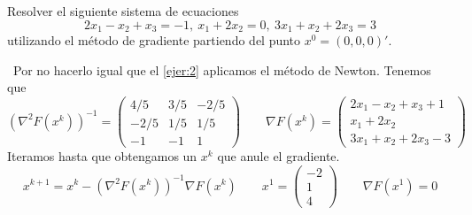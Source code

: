 \documentclass[twoside]{article}
\begin{document}
\newpage 

\begin{ejercicio}{9}
Resolver el siguiente sistema de ecuaciones
\[
2x_1-x_2+x_3=-1,\ x_1+2x_2=0,\ 3x_1+x_2+2x_3=3
\]
utilizando el método de gradiente partiendo del punto $x^0=(0,0,0)'$.
\begin{solucion}\
Por no hacerlo igual que el \ref{ejer:2} aplicamos el método de Newton. Tenemos que
$$(\nabla^2 F(x^k))^{-1}=\begin{pmatrix}
4/5 & 3/5 & -2/5\\
-2/5 & 1/5 & 1/5\\
 -1 & -1 & 1
\end{pmatrix}\qquad 
\nabla F(x^k) = \begin{pmatrix}
2x_1-x_2+x_3+1\\
x_1+2x_2\\
3x_1+x_2+2x_3-3
\end{pmatrix}
$$
Iteramos hasta que obtengamos un $x^k$ que anule el gradiente.
$$
x^{k+1}=x^k - (\nabla^2 F(x^k))^{-1}\nabla F(x^k) \qquad x^1 = \begin{pmatrix}
-2\\
1\\
4
\end{pmatrix} \qquad \nabla F(x^1) = 0
$$
\end{solucion}
\end{ejercicio}

\newpage 
\end{document}
